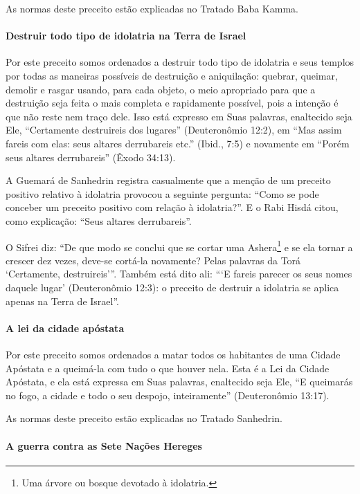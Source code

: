 As normas deste preceito estão explicadas no Tratado Baba Kamma.

\paragraph{Destruir todo tipo de idolatria na Terra de Israel}

Por este preceito somos ordenados a destruir todo tipo de idolatria e
seus templos por todas as maneiras possíveis de destruição e
aniquilação: quebrar, queimar, demolir e rasgar usando, para cada
objeto, o meio apropriado para que a destruição seja feita o mais
completa e rapidamente possível, pois a intenção é que não reste nem
traço dele. Isso está expresso em Suas palavras, enaltecido seja Ele,
``Certamente destruireis dos lugares'' (Deuteronômio 12:2), em ``Mas
assim fareis com elas: seus altares derrubareis etc.'' (Ibid., 7:5) e
novamente em ``Porém seus altares derrubareis'' (Êxodo 34:13).

A Guemará de Sanhedrin registra casualmente que a menção de um preceito
positivo relativo à idolatria provocou a seguinte pergunta: ``Como se
pode conceber um preceito positivo com relação à idolatria?''. E o Rabi
Hisdá citou, como explicação: ``Seus altares derrubareis''.

O Sifrei diz: ``De que modo se conclui que se cortar uma
Ashera\footnote{Uma árvore ou bosque devotado à idolatria.}
e se ela tornar a crescer dez vezes, deve-se cortá-la novamente? Pelas
palavras da Torá `Certamente, destruireis'''. Também está dito ali:
```E fareis parecer os seus nomes daquele lugar' (Deuteronômio 12:3): o
preceito de destruir a idolatria se aplica apenas na Terra de Israel''.

\paragraph{A lei da cidade apóstata}

Por este preceito somos ordenados a matar todos os habitantes de uma
Cidade Apóstata e a queimá-la com tudo o que houver nela. Esta é a Lei
da Cidade Apóstata, e ela está expressa em Suas palavras, enaltecido
seja Ele, ``E queimarás no fogo, a cidade e todo o seu despojo,
inteiramente'' (Deuteronômio 13:17).

As normas deste preceito estão explicadas no Tratado Sanhedrin.

\paragraph{A guerra contra as Sete Nações Hereges}

